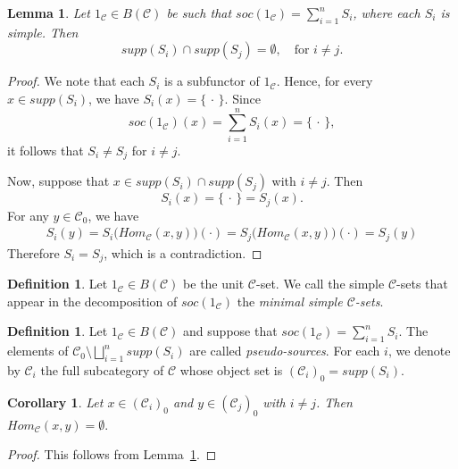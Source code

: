 \documentclass[a4paper]{article}
\newtheorem{cor}[thm]{Corollary}
\newtheorem{lem}[thm]{Lemma}
\theoremstyle{definition}
\newtheorem{defi}[thm]{Definition}
\theoremstyle{remark}
\newcommand*{\cat}[1]{\mathcal{#1}}
\begin{document}
\begin{lem} \label{supp si sj}
Let $1_{\cat{C}} \in B(\cat{C})$ be such that $soc(1_\cat{C}) = \sum_{i=1}^n S_i$,
where each $S_i$ is simple. Then
\[
    supp(S_i) \cap supp(S_j) = \emptyset, \quad \text{for } i \neq j.
\]
\end{lem}
\begin{proof}
 We note that each $S_i$ is a subfunctor of $1_{\cat{C}}$. Hence, for every
$x \in supp(S_i)$, we have $S_i(x) = \{\, \cdot \,\}$. Since
\[
    soc(1_\cat{C})(x) = \sum_{i=1}^n S_i(x) = \{\, \cdot \,\},
\]
it follows that $S_i \neq S_j$ for $i \neq j$.

Now, suppose that $x \in supp(S_i) \cap supp(S_j)$ with $i \neq j$.
Then
\[
    S_i(x) = \{\, \cdot \,\} = S_j(x).
\]
For any $y \in \cat{C}_0$, we have
\begin{align*}
   S_i(y)
    = S_i\bigl(Hom_{\cat{C}}(x,y)\bigr)(\cdot)
    = S_j\bigl(Hom_{\cat{C}}(x,y)\bigr)(\cdot)
    = S_j(y) 
\end{align*}
Therefore $S_i = S_j$, which is a contradiction.
\end{proof}
\begin{defi}
Let $1_\cat{C} \in B(\cat{C})$ be the unit $\cat{C}$-set. We call the simple $\cat{C}$-sets that appear in the decomposition of $soc(1_{\cat{C}})$ the \emph{minimal simple $\cat{C}$-sets}.
\end{defi}

\begin{defi} \label{cat ci}
Let $1_\cat{C} \in B(\cat{C})$ and suppose that $soc(1_\cat{C}) = \sum_{i=1}^n S_i.$ 
The elements of $\cat{C}_0 \setminus \bigsqcup_{i=1}^n supp(S_i)$ are called  \emph{pseudo-sources}.  
For each $i$, we denote by $\cat{C}_i$ the full subcategory of $\cat{C}$
whose object set is $ (\cat{C}_i)_0 = supp(S_i).$
\end{defi}
\begin{cor}
Let $x \in (\cat{C}_i)_0$ and $y \in (\cat{C}_j)_0$ with $i \neq j$. Then
$  Hom_{\cat{C}}(x,y) = \emptyset.$
\end{cor}

\begin{proof}
This follows from Lemma~\ref{supp si sj}.
\end{proof}
\end{document}
